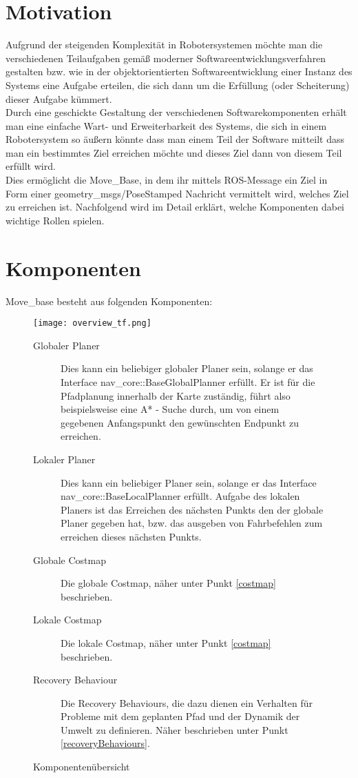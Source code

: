 \documentclass[oribibl]{llncs}
\begin{document}
\section{Motivation}
Aufgrund der steigenden Komplexität in Robotersystemen möchte man die verschiedenen Teilaufgaben gemäß moderner Softwareentwicklungsverfahren gestalten bzw. wie in der objektorientierten Softwareentwicklung einer Instanz des Systems eine Aufgabe erteilen, die sich dann um die Erfüllung (oder Scheiterung) dieser Aufgabe kümmert.\\
Durch eine geschickte Gestaltung der verschiedenen Softwarekomponenten erhält man eine einfache Wart- und Erweiterbarkeit des Systems, die sich in einem Robotersystem so äußern könnte dass man einem Teil der Software mitteilt dass man ein bestimmtes Ziel erreichen möchte und dieses Ziel dann von diesem Teil erfüllt wird.\\
Dies ermöglicht die Move\_Base, in dem ihr mittels ROS-Message ein Ziel in Form einer geometry\_msgs/PoseStamped Nachricht vermittelt wird, welches Ziel zu erreichen ist. Nachfolgend wird im Detail erklärt, welche Komponenten dabei wichtige Rollen spielen.
\section{Komponenten}
Move\_base besteht aus folgenden Komponenten: \cite{moveBase}
\begin{figure}
	\centering
  \texttt{[image: overview\_tf.png]}
	\caption{Komponentenübersicht}
	\cite{moveBaseComponenents}
\begin{description}	
\item[Globaler Planer]
Dies kann ein beliebiger globaler Planer sein, solange er das Interface nav\_core::BaseGlobalPlanner erfüllt. Er ist für die Pfadplanung innerhalb der Karte zuständig, führt also beispielsweise eine A* - Suche durch, um von einem gegebenen Anfangspunkt den gewünschten Endpunkt zu erreichen.
\item[Lokaler Planer]
Dies kann ein beliebiger Planer sein, solange er das Interface nav\_core::BaseLocalPlanner erfüllt. Aufgabe des lokalen Planers ist das Erreichen des nächsten Punkts den der globale Planer gegeben hat, bzw. das ausgeben von Fahrbefehlen zum erreichen dieses nächsten Punkts.
\item[Globale Costmap]
Die globale Costmap, näher unter Punkt \ref{costmap} beschrieben.
\item[Lokale Costmap]
Die lokale Costmap, näher unter Punkt \ref{costmap} beschrieben.
\item[Recovery Behaviour]
Die Recovery Behaviours, die dazu dienen ein Verhalten für Probleme mit dem geplanten Pfad und der Dynamik der Umwelt zu definieren. Näher beschrieben unter Punkt \ref{recoveryBehaviours}.
\end{description}
\end{figure}
\end{document}
